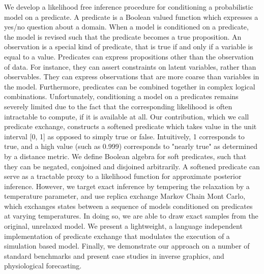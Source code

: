 We develop a likelihood free inference procedure for conditioning a probabilistic model on a predicate.
A predicate is a Boolean valued function which expresses a yes/no question about a domain.
When a model is conditioned on a predicate, the model is revised such that the predicate becomes a true proposition.
An observation is a special kind of predicate, that is true if and only if a variable is equal to a value.
Predicates can express propositions other than the observation of data.
For instance, they can assert constraints on latent variables, rather than observables.
They can express observations that are more coarse than variables in the model.
Furthermore, predicates can be combined together in complex logical combinations.
Unfortunately, conditioning a model on a predicates remains severely limited due to the fact that the corresponding likelihood is often intractable to compute, if it is available at all.
Our contribution, which we call predicate exchange, 
constructs a softened predicate which takes value in the unit interval [0, 1] as opposed to simply true or false. Intuitively, 1 corresponds to true, and a high value (such as 0.999) corresponds to "nearly true" as determined by a distance metric.
We define Boolean algebra for soft predicates,  such that they can be negated, conjoined and disjoined arbitrarily.
A softened predicate can serve as a tractable proxy to a likelihood function for approximate posterior inference.
However, we target exact inference by tempering the relaxation by a temperature parameter, and use replica exchange Markov Chain Mont Carlo, which exchanges states between a sequence of models conditioned on predicates at varying temperatures.
In doing so, we are able to draw exact samples from the original, unrelaxed model.
We present a lightweight, a language independent implementation of predicate exchange that modulates the execution of a simulation based model.
Finally, we demonstrate our approach on a number of standard benchmarks and present case studies in inverse graphics, and physiological forecasting.